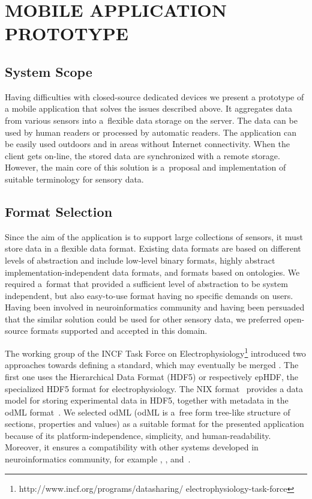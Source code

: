 \documentclass[a4paper,twoside]{article}
\begin{document}
\section{\uppercase{Mobile application prototype}}
\label{mobile_app_prototype}


\subsection{System Scope}

Having difficulties with closed-source dedicated devices we present a prototype of a mobile application that solves the issues described above. It aggregates data from various sensors into a~flexible data storage on the server. The data can be used by human readers or processed by automatic readers. The application can be easily used outdoors and in areas without Internet connectivity. When the client gets on-line, the stored data are synchronized with a remote storage. However, the main core of this solution is a~proposal and implementation of suitable terminology for sensory data.

\subsection{Format Selection}

Since the aim of the application is to support large collections of sensors, it must store data in a flexible data format. Existing data formats are based on different levels of abstraction and include low-level binary formats, highly abstract implementation-independent data formats, and formats based on ontologies. We required a~format that provided a sufficient level of abstraction to be system independent, but also easy-to-use format having no specific demands on users. Having been involved in neuroinformatics community and having been persuaded that the similar solution could be used for other sensory data, we preferred open-source formats supported and accepted in this domain.

The working group of the INCF Task Force on Electrophysiology\footnote{http://www.incf.org/programs/datasharing/ electrophysiology-task-force} introduced two approaches towards defining a standard, which may eventually be merged \cite{10.3389/conf.fninf.2013.09.00069}. The first one uses the Hierarchical Data Format (HDF5) \cite{hdf5} or respectively epHDF, the  specialized HDF5 format for electrophysiology. The NIX format~\cite{Stoewer:2014} provides a data model for storing experimental data in HDF5, together with metadata in the odML format~\cite{10.3389/fninf.2011.00016}. We selected odML (odML is a~free form tree-like structure of sections, properties and values) as a suitable format for the presented application because of its platform-independence, simplicity, and human-readability. Moreover, it ensures a compatibility with other systems developed in neuroinformatics community, for example \cite{10.3389/conf.fninf.2014.18.00029}, \cite{10.3389/conf.fninf.2014.18.00053}, and~\cite{10.3389/conf.fninf.2013.09.00025}.
\end{document}
